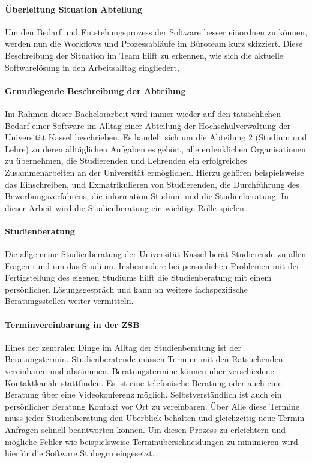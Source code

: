 \documentclass[12pt]{article}
\begin{document}
\paragraph{Überleitung Situation Abteilung}
Um den Bedarf und Entstehungsprozess der Software besser einordnen zu können,
werden nun die Workflows und Prozessabläufe im Büroteam kurz skizziert. Diese
Beschreibung der Situation im Team hilft zu erkennen, wie sich die aktuelle
Softwarelösung in den Arbeitsalltag eingliedert,

\paragraph{Grundlegende Beschreibung der Abteilung}
Im Rahmen dieser Bachelorarbeit wird immer wieder auf den tatsächlichen Bedarf
einer Software im Alltag einer Abteilung der Hochschulverwaltung der Universität
Kassel beschrieben. Es handelt sich um die Abteilung 2 (Studium und Lehre) zu
deren alltäglichen Aufgaben es gehört, alle erdenklichen Organisationen zu
übernehmen, die Studierenden und Lehrenden ein erfolgreiches Zusammenarbeiten
an der Universität ermöglichen. Hierzu gehören beispielsweise das Einschreiben,
und Exmatrikulieren von Studierenden, die Durchführung des Bewerbungsverfahrens, die information Studium
und die Studienberatung. In dieser Arbeit wird die Studienberatung ein wichtige
Rolle spielen.

\paragraph{Studienberatung}
Die allgemeine Studienberatung der Universität Kassel berät Studierende zu allen Fragen rund um
das Studium. Insbesondere bei persönlichen Problemen mit der Fertigstellung
des eigenen Studiums hilft die Studienberatung mit einem persönlichen
Lösungsgespräch und kann an weitere fachspezifische Beratungsstellen weiter
vermitteln.\cite{studBeratungKsWeb}

\paragraph{Terminvereinbarung in der ZSB}
Eines der zentralen Dinge im Alltag der Studienberatung ist der Beratungstermin.
Studienberatende müssen Termine mit den Ratsuchenden vereinbaren und abstimmen.
Beratungstermine können über verschiedene Kontaktkanäle stattfinden. Es ist eine
telefonische Beratung oder auch eine Beratung über eine Videokonferenz möglich.
Selbstverständlich ist auch ein persönlicher Beratung Kontakt vor Ort zu
vereinbaren. Über Alle diese Termine muss jeder Studienberatung den Überblick
behalten und gleichzeitig neue Termin-Anfragen schnell beantworten können. Um
diesen Prozess zu erleichtern und mögliche Fehler wie beispielsweise
Terminüberschneidungen zu minimieren wird hierfür die Software Stubegru
eingesetzt.
\end{document}
